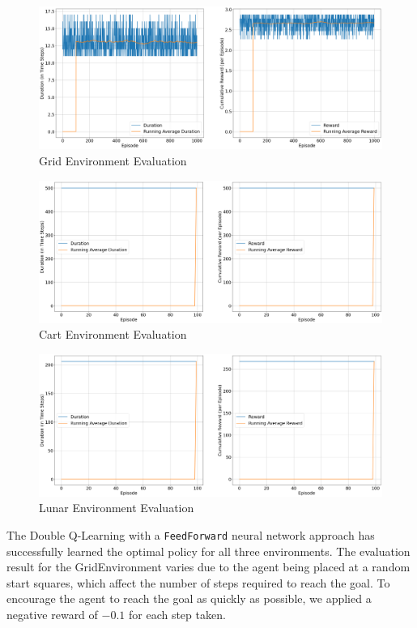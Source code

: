 \documentclass{article} %
\begin{document}
\begin{figure}[H]
    \begin{center}
        \includegraphics[width=\textwidth]{grid_evaluate_ddqn.png}
    \end{center}
    \caption{Grid Environment Evaluation}
\end{figure}

\begin{figure}[H]
    \begin{center}
        \includegraphics[width=\textwidth]{cart_evaluate.png}
    \end{center}
    \caption{Cart Environment Evaluation}
\end{figure}

\begin{figure}[H]
    \begin{center}
        \includegraphics[width=\textwidth]{lunar_evaluate_ddqn.png}
    \end{center}
    \caption{Lunar Environment Evaluation}
\end{figure}

The Double Q-Learning with a \verb|FeedForward| neural network approach has successfully learned the optimal
policy for all three environments. The evaluation result for the GridEnvironment varies
due to the agent being placed at a random start squares, which affect the number of steps
required to reach the goal. To encourage the agent to reach the goal as quickly as possible,
we applied a negative reward of $-0.1$ for each step taken.




\printbibliography
\end{document}
